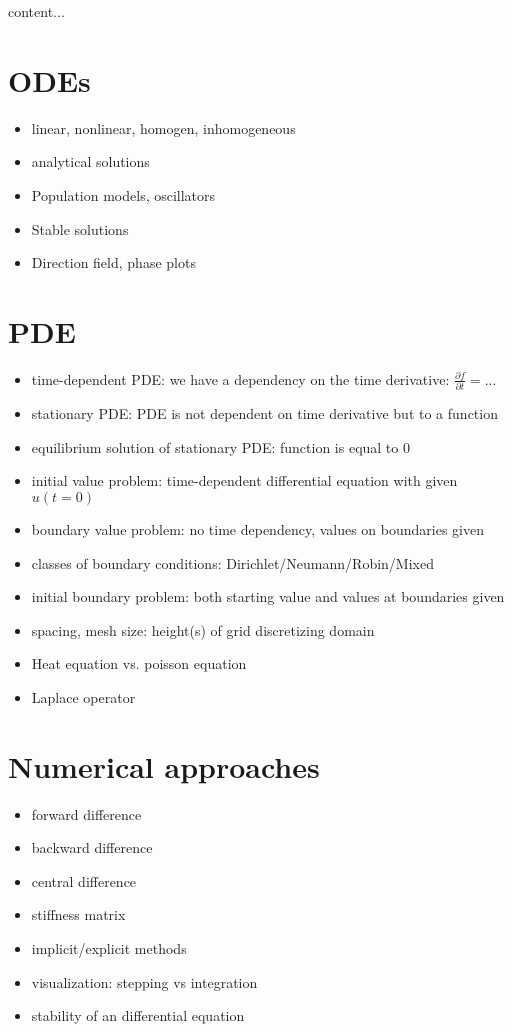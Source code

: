 \begin{definition}
	content...
\end{definition}

\pagebreak

\section{ODEs}
\begin{itemize}
	\item linear, nonlinear, homogen, inhomogeneous
	\item analytical solutions
	\item Population models, oscillators
	\item Stable solutions
	\item Direction field, phase plots
\end{itemize}


\section{PDE}

\begin{itemize}
	\item time-dependent PDE: we have a dependency on the time derivative: $\frac{\partial f}{\partial t} = ...$
	\item stationary PDE: PDE is not dependent on time derivative but to a function 
	\item equilibrium solution of stationary PDE: function is equal to 0
	\item initial value problem: time-dependent differential equation with given $u(t=0)$
	\item boundary value problem: no time dependency, values on boundaries given
	\item classes of boundary conditions: Dirichlet/Neumann/Robin/Mixed
	\item initial boundary problem: both starting value and values at boundaries given
	\item spacing, mesh size: height(s) of grid discretizing domain
	\item Heat equation vs. poisson equation
	\item Laplace operator
\end{itemize}

\section{Numerical approaches}
\begin{itemize}
	\item forward difference
	\item backward difference
	\item central difference 
	\item stiffness matrix
	\item implicit/explicit methods
	\item visualization: stepping vs integration
	\item stability of an differential equation
\end{itemize}

